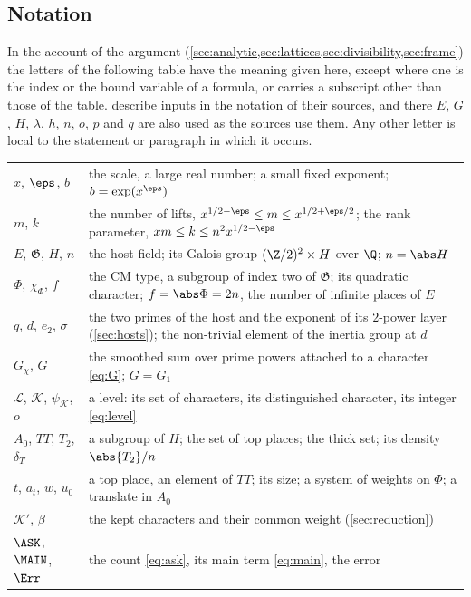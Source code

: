 \subsection*{Notation}
In the account of the argument (\cref{sec:analytic,sec:lattices,sec:divisibility,sec:frame})
the letters of the following table have the meaning given here, except where one is the index
or the bound variable of a formula, or carries a subscript other than those of the table.
 describe inputs in the
notation of their sources, and there $E$, $G$, $H$, $\lambda$, $h$, $n$, $o$, $p$ and $q$ are
also used as the sources use them. Any other letter is local to the statement or paragraph in
which it occurs.
\begin{center}\small
\begin{tabular}{@{}p{}p{}@{}}
\toprule
$x$, $\eps$, $b$ & the scale, a large real number; a small fixed exponent; $b=\exp(x^\eps)$\\
$m$, $k$ & the number of lifts, $x^{1/2-\eps}\le m\le x^{1/2+\eps/2}$; the rank parameter,
  $xm\le k\le n^2x^{1/2-\eps}$\\
$E$, $\mathfrak G$, $H$, $n$ & the host field; its Galois group $(\Z/2)^2\times H$ over $\Q$;
  $n=\abs H$\\
$\Phi$, $\chi_\Phi$, $f$ & the CM type, a subgroup of index two of $\mathfrak G$; its quadratic
  character; $f=\abs\Phi=2n$, the number of infinite places of $E$\\
$q$, $d$, $e_2$, $\sigma$ & the two primes of the host and the exponent of its $2$-power layer
  (\cref{sec:hosts}); the non-trivial element of the inertia group at $d$\\
$G_\chi$, $G$ & the smoothed sum over prime powers attached to a character
  \eqref{eq:G}; $G=G_1$\\
$\mathcal L$, $\mathcal K$, $\psi_{\mathcal K}$, $o$ & a level: its set of characters, its
  distinguished character, its integer \eqref{eq:level}\\
$A_0$, $TT$, $T_2$, $\delta_T$ & a subgroup of $H$; the set of top places; the thick set;
  its density $\abs{T_2}/n$\\
$t$, $a_t$, $w$, $u_0$ & a top place, an element of $TT$; its size; a system of weights on
  $\Phi$; a translate in $A_0$\\
$\mathcal K'$, $\beta$ & the kept characters and their common weight (\cref{sec:reduction})\\
$\ASK$, $\MAIN$, $\Err$ & the count \eqref{eq:ask}, its main term \eqref{eq:main}, the error

\end{tabular}
\end{center}
